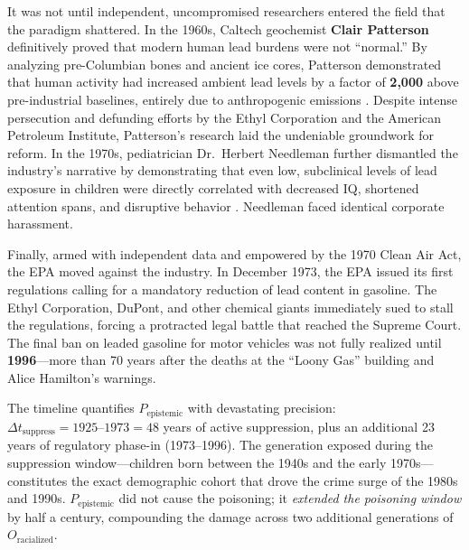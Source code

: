 \documentclass[12pt,openany]{book}
\begin{document}
It was not until independent, uncompromised researchers entered the field that the paradigm shattered. In the 1960s, Caltech geochemist \textbf{Clair Patterson} definitively proved that modern human lead burdens were not ``normal.'' By analyzing pre-Columbian bones and ancient ice cores, Patterson demonstrated that human activity had increased ambient lead levels by a factor of \textbf{2,000} above pre-industrial baselines, entirely due to anthropogenic emissions \cite{tel_patterson}. Despite intense persecution and defunding efforts by the Ethyl Corporation and the American Petroleum Institute, Patterson's research laid the undeniable groundwork for reform. In the 1970s, pediatrician Dr.\ Herbert Needleman further dismantled the industry's narrative by demonstrating that even low, subclinical levels of lead exposure in children were directly correlated with decreased IQ, shortened attention spans, and disruptive behavior \cite{tel_needleman}. Needleman faced identical corporate harassment.

Finally, armed with independent data and empowered by the 1970 Clean Air Act, the EPA moved against the industry. In December 1973, the EPA issued its first regulations calling for a mandatory reduction of lead content in gasoline. The Ethyl Corporation, DuPont, and other chemical giants immediately sued to stall the regulations, forcing a protracted legal battle that reached the Supreme Court. The final ban on leaded gasoline for motor vehicles was not fully realized until \textbf{1996}---more than 70 years after the deaths at the ``Loony Gas'' building and Alice Hamilton's warnings.

The timeline quantifies $P_{\text{epistemic}}$ with devastating precision: $\Delta t_{\text{suppress}} = 1925 \text{--} 1973 = 48$ years of active suppression, plus an additional 23 years of regulatory phase-in (1973--1996). The generation exposed during the suppression window---children born between the 1940s and the early 1970s---constitutes the exact demographic cohort that drove the crime surge of the 1980s and 1990s. $P_{\text{epistemic}}$ did not cause the poisoning; it \textit{extended the poisoning window} by half a century, compounding the damage across two additional generations of $O_{\text{racialized}}$.
\end{document}
